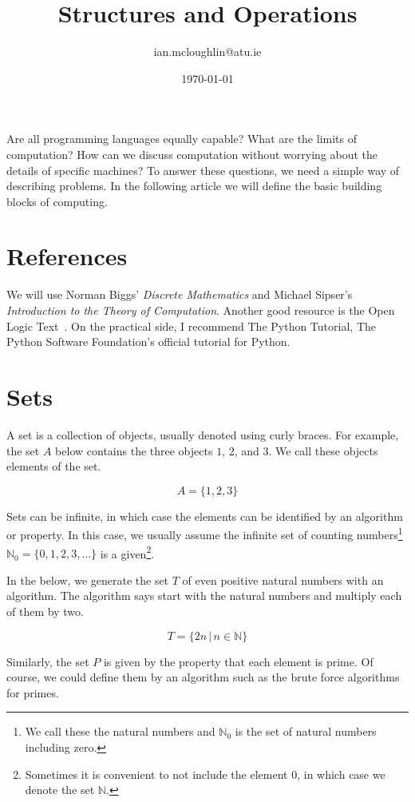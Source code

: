 \documentclass{iansnotes}
\title{Structures and Operations}
\author{ian.mcloughlin@atu.ie}
\date{\today}
\begin{document}
\maketitle

Are all programming languages equally capable?
What are the limits of computation?
How can we discuss computation without worrying about the details of specific machines?
To answer these questions, we need a simple way of describing problems.
In the following article we will define the basic building blocks of computing.


\section{References}
  We will use Norman Biggs' \emph{Discrete Mathematics}\autocite{biggs} and Michael Sipser's \emph{Introduction to the Theory of Computation}\autocite{sipser}.
  Another good resource is the Open Logic Text~\autocite{openlogictext}.
  On the practical side, I recommend The Python Tutorial\autocite{pythontutorial}, The Python Software Foundation's official tutorial for Python.


\section{Sets} 
  A set is a collection of objects, usually denoted using curly braces\autocite[3]{sipser}.
  For example, the set $A$ below contains the three objects $1$, $2$, and $3$.
  We call these objects elements of the set.

  $$ A = \{ 1, 2, 3 \} $$

  Sets can be infinite, in which case the elements can be identified by an algorithm or property.
  In this case, we usually assume the infinite set of counting numbers\footnote{We call these the natural numbers and $\mathbb{N}_0$ is the set of natural numbers including zero.} $\mathbb{N}_0 = \{ 0, 1, 2, 3, \ldots \}$ is a given\footnote{Sometimes it is convenient to not include the element $0$, in which case we denote the set $\mathbb{N}$.}.

  In the below, we generate the set $T$ of even positive natural numbers with an algorithm.
  The algorithm says start with the natural numbers and multiply each of them by two.

  $$ T = \{ 2n \, | \, n \in \mathbb{N} \} $$
  
  Similarly, the set $P$ is given by the property that each element is prime.
  Of course, we could define them by an algorithm such as the brute force algorithms for primes.
  
\end{document}
